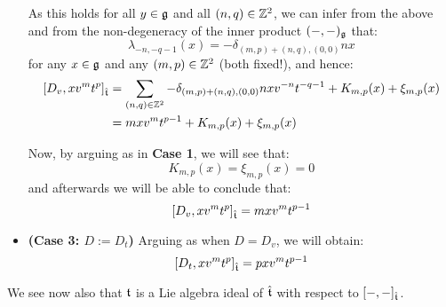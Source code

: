 \begin{remark}
\begin{itemize}
                    As this holds for all $y \in \mathfrak{g}$ and all $(n, q) \in \mathbb{Z}^2$, we can infer from the above and from the non-degeneracy of the inner product $(-, -)_{\mathfrak{g}}$ that:
                        $$\lambda_{-n, -q - 1}(x) = -\delta_{(m, p) + (n, q), (0, 0)} n x$$
                    for any $x \in \mathfrak{g}$ and any $(m, p) \in \mathbb{Z}^2$ (both fixed!), and hence:
                        $$
                            \begin{aligned}
                                [D_v, x v^m t^p]_{\hat{\t}} & = \sum_{(n, q) \in \Z^2} -\delta_{(m, p) + (n, q), (0, 0)} n x v^{-n} t^{-q - 1} + K_{m, p}(x) + \xi_{m, p}(x)
                                \\
                                & = m x v^m t^{p - 1} + K_{m, p}(x) + \xi_{m, p}(x)
                            \end{aligned}
                        $$

                    Now, by arguing as in \textbf{Case 1}, we will see that:
                        $$K_{m, p}(x) = \xi_{m, p}(x) = 0$$
                    and afterwards we will be able to conclude that:
                        $$[D_v, x v^m t^p]_{\hat{\mathfrak{t}}} = m x v^m t^{p - 1}$$
                    \item \textbf{(Case 3: $D := D_t$)} Arguing as when $D = D_v$, we will obtain:
                        $$[D_t, x v^m t^p]_{\hat{\mathfrak{t}}} = p x v^m t^{p - 1}$$
                \end{itemize}
            \end{remark}
            \begin{remark}
                We see now also that $\mathfrak{t}$ is a Lie algebra ideal of $\hat{\mathfrak{t}}$ with respect to $[-, -]_{\hat{\mathfrak{t}}}$.
            \end{remark}


